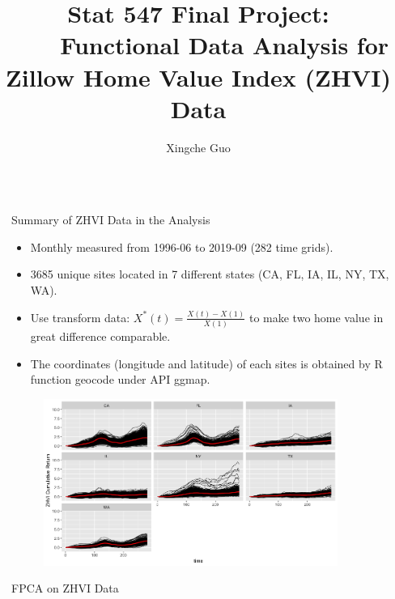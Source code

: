 \documentclass[final]{beamer}
\title{Stat 547 Final Project: \ \ \ \  Functional Data Analysis for Zillow Home Value Index (ZHVI) Data}
\author{Xingche Guo \inst{}}
\institute[shortinst]{\inst{} }
\newlength{\sepwidth}
\newlength{\colwidth}
\newcommand{\separatorcolumn}{\begin{column}{\sepwidth}\end{column}}
\begin{document}
\begin{frame}[t]
\begin{columns}[t]
\separatorcolumn



\begin{column}{\colwidth}

  \vspace{-1em}
  
  \begin{block}{Summary of ZHVI Data in the Analysis}
\begin{itemize}
\item Monthly measured from 1996-06 to 2019-09 (282 time grids).
\item 3685 unique sites located in 7 different states (CA, FL, IA, IL, NY, TX, WA).
\item Use transform data: $X^{*}(t) = \frac{X(t) - X(1)}{X(1)}$ to make two home value in great difference comparable.
\item The coordinates (longitude and latitude) of each sites is obtained by R function \textcolor{blue1}{geocode} under API \textcolor{blue1}{ggmap}.
\end{itemize}

  \vspace{-1em}
 \begin{figure}[h]
\includegraphics[width=0.9\textwidth]{figure/data_intro.png}
\end{figure}

  \end{block}


  \vspace{-1.5em}

  \begin{block}{FPCA on ZHVI Data}
  

\end{block}
\end{column}
\end{columns}
\end{frame}
\end{document}
